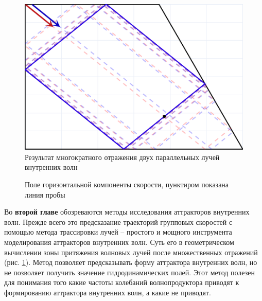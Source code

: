 \documentclass[utf8x]{G7-32} %
\begin{document}
\begin{figure}[h!]
    \centering
    \includegraphics[scale=1.1]{../Figs/RayTracing1.png}
    \caption{Результат многократного отражения двух параллельных лучей внутренних волн}
    \label{fig:RayTr}
\end{figure}

\begin{figure}[!ht]
    \centering
    \caption{Поле горизонтальной компоненты скорости, пунктиром показана линия пробы}
    \label{fig:attractorRes}
\end{figure}

Во \textbf{второй главе} обозреваются методы исследования аттракторов внутренних волн. Прежде всего это предсказание траекторий групповых скоростей с помощью метода трассировки лучей -- простого и мощного инструмента моделирования аттракторов внутренних волн. Суть его в геометрическом вычислении зоны притяжения волновых лучей после множественных отражений (рис. \ref{fig:RayTr}). Метод позволяет предсказывать форму аттрактора внутренних волн, но не позволяет получить значение гидродинамических полей. Этот метод полезен для понимания того какие частоты колебаний волнопродуктора приводят к формированию аттрактора внутренних волн, а какие не приводят.
\end{document}
